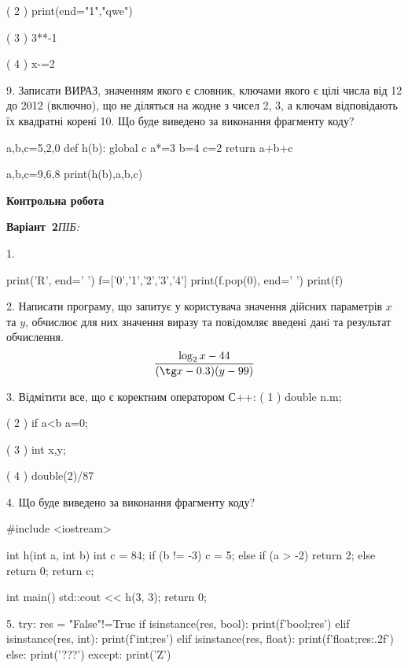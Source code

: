 \documentclass[11pt]{article}
\begin{document}
( 2 ) print(end="1","qwe")

( 3 ) 3**-1

( 4 ) x-=2

9. 
Записати ВИРАЗ, значенням якого є словник, ключами якого є цілі числа від 12 до 2012 (включно), що не діляться на жодне з чисел 2, 3, а ключам відповідають їх квадратні корені 
10. Що буде виведено за виконання фрагменту коду?

a,b,c=5,2,0
def h(b):
global c    a*=3
    b=4
    c=2
    return a+b+c

a,b,c=9,6,8
print(h(b),a,b,c)











\newpage

\newpage

{\large\textbf{Контрольна робота}}

\textbf{Варіант \No\,2}\hfill \textit{ПІБ:}\,\underline{\hspace{60mm}}
\vspace{4mm}

1. 

print('R', end=' ')
f=['0','1','2','3','4']
print(f.pop(0), end=' ')
print(f)


2. 
Написати програму, що запитує у користувача значення дійсних параметрів $x$ та $y$, обчислює для них значення виразу та повiдомляє введенi данi та результат обчислення.
$$\frac{\log_{2} x - 44}{(\tg x - 0.3) (y - 99)}$$ 


3. %
Відмітити все, що є коректним оператором С++:
( 1 ) double n.m;

( 2 ) if a<b a=0;

( 3 ) {int x,y;}

( 4 ) double(2)/87

4. Що буде виведено за виконання фрагменту коду?

#include <iostream>

int h(int a, int b){
    int c = 84;
    if (b != -3)
        c = 5;
    else if (a > -2)
         return 2;
    else 
        return 0;
    return c;
}

int main(){
    std::cout << h(3, 3);
    return 0;
}

5. 
try:
    res = "False"!=True
    if isinstance(res, bool):
        print(f'bool;{res}')
    elif isinstance(res, int):
        print(f'int;{res}')
    elif isinstance(res, float):
        print(f'float;{res:.2f}')
    else:
        print('???')
except:
    print('Z')
\end{document}
